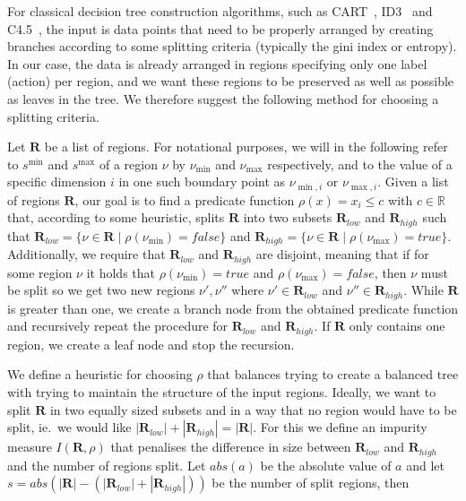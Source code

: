 For classical decision tree construction algorithms, such as CART~\cite{?},
ID3~\cite{?} and C4.5~\cite{?}, the input is data points that need to be
properly arranged by creating branches according to some splitting criteria
(typically the gini index or entropy). In our case, the data is already arranged
in regions specifying only one label (action) per region, and we want these
regions to be preserved as well as possible as leaves in the tree. We therefore
suggest the following method for choosing a splitting criteria.

Let $\mathbf{R}$ be a list of regions. For notational purposes, we will in the
following refer to $s^{\min}$ and $s^{\max}$ of a region $\nu$ by $\nu_{\min}$
and $\nu_{\max}$ respectively, and to the value of a specific dimension $i$ in
one such boundary point as $\nu_{\min, i}$ or $\nu_{\max,i}$.  Given a list of
regions $\mathbf{R}$, our goal is to find a predicate function $\rho(x) = x_{i}
\leq c$ with $c \in \mathbb{R}$ that, according to some heuristic, splits
$\mathbf{R}$ into two subsets $\mathbf{R}_{low}$ and $\mathbf{R}_{high}$ such
that $\mathbf{R}_{low} = \{ \nu \in \mathbf{R} \mid \rho(\nu_{\min}) = false \}$
and $\mathbf{R}_{high} = \{ \nu \in \mathbf{R} \mid \rho(\nu_{\max}) = true \}$.
Additionally, we require that $\mathbf{R}_{low}$ and $\mathbf{R}_{high}$ are
disjoint, meaning that if for some region $\nu$ it holds that $\rho(\nu_{\min})
= true$ and $\rho(\nu_{\max}) = false$, then $\nu$ must be split so we get two
new regions $\nu', \nu''$ where $\nu' \in \mathbf{R}_{low}$ and $\nu'' \in
\mathbf{R}_{high}$. While $\mathbf{R}$ is greater than one, we create a branch
node from the obtained predicate function and recursively repeat the procedure
for $\mathbf{R}_{low}$ and $\mathbf{R}_{high}$. If $\mathbf{R}$ only contains
one region, we create a leaf node and stop the recursion.


We define a heuristic for choosing $\rho$ that balances trying to create a
balanced tree with trying to maintain the structure of the input regions.
Ideally, we want to split $\mathbf{R}$ in two equally sized subsets and in a way
that no region would have to be split, ie.\ we would like
$|\mathbf{R}_{low}| + |\mathbf{R}_{high}| = |\mathbf{R}|$. For this we define an
impurity measure $I(\mathbf{R},\rho)$ that penalises the
difference in size between $\mathbf{R}_{low}$ and $\mathbf{R}_{high}$ and the
number of regions split. Let $abs(a)$ be the absolute value of
$a$ and let $s = abs(|\mathbf{R}| - (|\mathbf{R}_{low}| + |\mathbf{R}_{high}|))$
be the number of split regions, then

